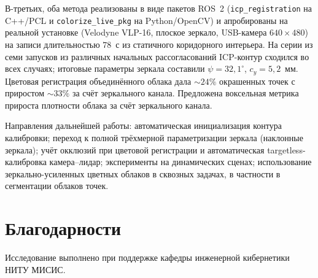 \documentclass{misisarticle}
\begin{document}
В-третьих, оба метода реализованы в виде пакетов ROS~2
(\texttt{icp\_registration} на C++/PCL и \texttt{colorize\_live\_pkg}
на Python/OpenCV) и апробированы на реальной установке
(Velodyne VLP-16, плоское зеркало, USB-камера $640\times 480$) на
записи длительностью $78$~с из статичного коридорного интерьера. На
серии из семи запусков из различных начальных рассогласований
ICP-контур сходился во всех случаях; итоговые параметры зеркала
составили $\psi = 32{,}1^{\circ}$, $c_y = 5{,}2$~мм. Цветовая
регистрация объединённого облака дала $\sim 24\%$ окрашенных точек с
приростом $\sim 33\%$ за счёт зеркального канала. Предложена
воксельная метрика прироста плотности облака за счёт зеркального
канала.

Направления дальнейшей работы: автоматическая инициализация контура
калибровки; переход к полной трёхмерной параметризации зеркала
(наклонные зеркала); учёт окклюзий при цветовой регистрации и
автоматическая targetless-калибровка камера--лидар; эксперименты на
динамических сценах; использование зеркально-усиленных цветных облаков
в сквозных задачах, в частности в сегментации облаков точек.

\section*{Благодарности}

Исследование выполнено при поддержке кафедры инженерной кибернетики НИТУ МИСИС.
\end{document}
